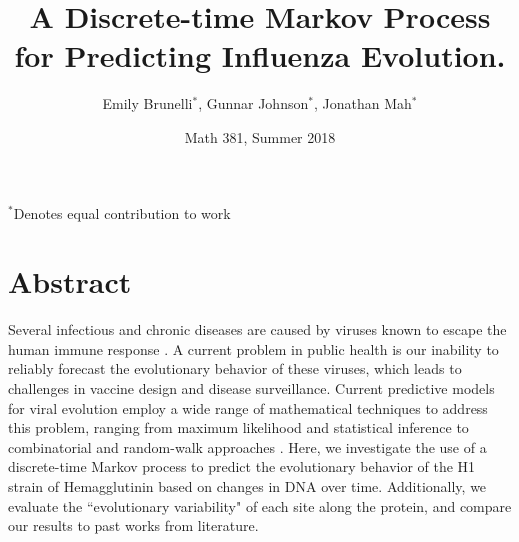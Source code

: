 \documentclass[12pt]{article}
\title{A Discrete-time Markov Process for Predicting Influenza Evolution.}
\author{Emily Brunelli$^*$, Gunnar Johnson$^*$, Jonathan Mah$^*$}
\date{Math 381, Summer 2018}
\begin{document}
\maketitle
\footnotesize{$^*$Denotes equal contribution to work}\\

\section{Abstract}
Several infectious and chronic diseases are caused by viruses known to escape the human immune response \citep{russell2014science}. A current problem in public health is our inability to reliably forecast the evolutionary behavior of these viruses, which leads to challenges in vaccine design and disease surveillance. Current predictive models for viral evolution employ a wide range of mathematical techniques to address this problem, ranging from maximum likelihood and statistical inference to combinatorial and random-walk approaches \citep{kosakovsky2005not}. Here, we investigate the use of a discrete-time Markov process to predict the evolutionary behavior of the H1 strain of Hemagglutinin based on changes in DNA over time. Additionally, we evaluate the ``evolutionary variability" of each site along the protein, and compare our results to past works from literature.

\clearpage
\end{document}
